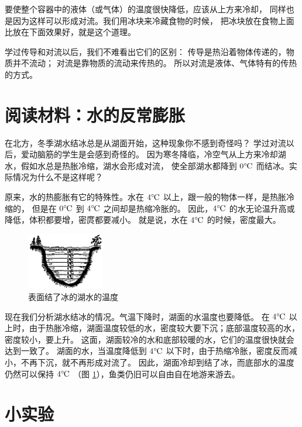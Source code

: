 要使整个容器中的液体（或气体）的温度很快降低，应该从上方来冷却，
同样也是因为这样可以形成对流。我们用冰块来冷藏食物的时候，
把冰块放在食物上面比放在下面效果好，就是这个道理。

学过传导和对流以后，我们不难看出它们的区别：
传导是热沿着物体传递的，物质并不流动；
对流是靠物质的流动来传热的。
所以对流是液体、气体特有的传热的方式。



\section*{阅读材料：水的反常膨胀}

在北方，冬季湖水结冰总是从湖面开始，这种现象你不感到奇怪吗？
学过对流以后，爱动脑筋的学生是会感到奇怪的。
因为寒冬降临，冷空气从上方来冷却湖水，假如水总是热胀冷缩，湖水会形成对流，
使全部湖水都降到 $0\celsius$ 而结冰。实际情况为什么不是这样呢？

原来，水的热膨胀有它的特殊性。水在 $4\celsius$ 以上，跟一般的物体一样，是热胀冷缩的，
但是在 $0\celsius$ 到 $4\celsius$ 之间却是热缩冷胀的。
因此，$4\celsius$ 的水无论温升高或降低，体积都要增，密庹都要减小。
就是说，水在 $4\celsius$ 的时候，密度最大。

\begin{figure}[htbp]
    \centering
    \includegraphics[width=0.3\textwidth]{../pic/czwl2-ch2-17}
    \caption{表面结了冰的湖水的温度}\label{fig:2-17}
\end{figure}

现在我们分析湖水结冰的情况。气温下降时，湖面的水温度也要降低。
在 $4\celsius$ 以上时，由于热胀冷缩，湖面温度较低的水，密度较大要下沉；底部温度较高的水，密度较小，要上升。
这面，湖面较冷的水和底部较暖的水，它们的温度很快就会达到一致了。
湖面的水，当温度降低到 $4\celsius$ 以下时，由于热缩冷胀，密度反而减小，不再下沉，就不再形成对流了。
因此，湖面冷却到结了冰，而底部水的温度仍然可以保持 $4\celsius$ （图 \ref{fig:2-17}），鱼类仍旧可以自由自在地游来游去。



\section*{小实验}

